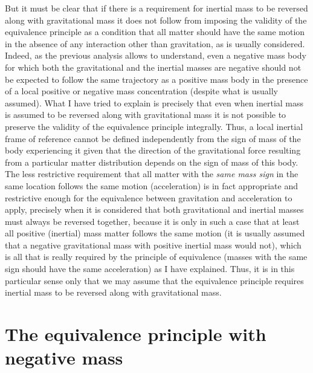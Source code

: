 \documentclass[notitlepage,12pt]{report}
\begin{document}
But it must be clear that if there is a requirement for inertial mass to be reversed along with gravitational mass it does not follow from imposing the validity of the equivalence principle as a condition that all matter should have the same motion in the absence of any interaction other than gravitation, as is usually considered. Indeed, as the previous analysis allows to understand, even a negative mass body for which both the gravitational and the inertial masses are negative should not be expected to follow the same trajectory as a positive mass body in the presence of a local positive or negative mass concentration (despite what is usually assumed). What I have tried to explain is precisely that even when inertial mass is assumed to be reversed along with gravitational mass it is not possible to preserve the validity of the equivalence principle integrally. Thus, a local inertial frame of reference cannot be defined independently from the sign of mass of the body experiencing it given that the direction of the gravitational force resulting from a particular matter distribution depends on the sign of mass of this body. The less restrictive requirement that all matter with the \textit{same mass sign} in the same location follows the same motion (acceleration) is in fact appropriate and restrictive enough for the equivalence between gravitation and acceleration to apply, precisely when it is considered that both gravitational and inertial masses must always be reversed together, because it is only in such a case that at least all positive (inertial) mass matter follows the same motion (it is usually assumed that a negative gravitational mass with positive inertial mass would not), which is all that is really required by the principle of equivalence (masses with the same sign should have the same acceleration) as I have explained. Thus, it is in this particular sense only that we may assume that the equivalence principle requires inertial mass to be reversed along with gravitational mass.

\section{The equivalence principle with negative mass}
\end{document}
